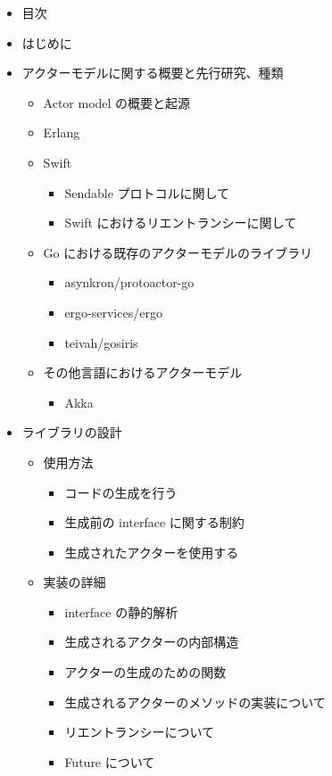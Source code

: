 \begin{itemize}
\item
  目次
\item
  はじめに
\item
  アクターモデルに関する概要と先行研究、種類

  \begin{itemize}
  \item
    Actor model の概要と起源
  \item
    Erlang
  \item
    Swift

    \begin{itemize}
    \item
      Sendable プロトコルに関して
    \item
      Swift におけるリエントランシーに関して
    \end{itemize}
  \item
    Go における既存のアクターモデルのライブラリ

    \begin{itemize}
    \item
      asynkron/protoactor-go
    \item
      ergo-services/ergo
    \item
      teivah/gosiris
    \end{itemize}
  \item
    その他言語におけるアクターモデル

    \begin{itemize}
    \item
      Akka
    \end{itemize}
  \end{itemize}
\item
  ライブラリの設計

  \begin{itemize}
  \item
    使用方法

    \begin{itemize}
    \item
      コードの生成を行う
    \item
      生成前の interface に関する制約
    \item
      生成されたアクターを使用する
    \end{itemize}
  \item
    実装の詳細

    \begin{itemize}
    \item
      interface の静的解析
    \item
      生成されるアクターの内部構造
    \item
      アクターの生成のための関数
    \item
      生成されるアクターのメソッドの実装について
    \item
      リエントランシーについて
    \item
      Future について


\end{itemize}
\end{itemize}
\end{itemize}
